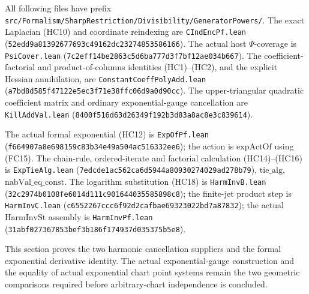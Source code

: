 All following files have prefix
\texttt{src/Formalism/SharpRestriction/Divisibility/GeneratorPowers/}.
The exact Laplacian (HC10) and coordinate reindexing are
\texttt{CIndEncPf.lean}
(\texttt{52edd9a81392677693c49162dc23274853586166}).
The actual host \(\Psi\)-coverage is
\texttt{PsiCover.lean}
(\texttt{7c2eff14be2863c5d6ba777d3f7bf12ae034b667}).
The coefficient-factorial and product-of-columns
identities (HC1)--(HC2), and the explicit Hessian
annihilation, are \texttt{ConstantCoeffPolyAdd.lean}
(\texttt{a7bd8d585f47122e5ec3f71e38ffc06d9a0d90cc}).
The upper-triangular quadratic coefficient matrix and
ordinary exponential-gauge cancellation are
\texttt{KillAddVal.lean}
(\texttt{8400f516d63d26349f192b3d83a8ac8e3c839614}).

The actual formal exponential (HC12) is
\texttt{ExpOfPf.lean}
(\texttt{f664907a8e698159c83b34e49a504ac516332ee6});
the action is \(\mathrm{expActOf}\) using (FC15).
The chain-rule, ordered-iterate and factorial calculation
(HC14)--(HC16) is \texttt{ExpTieAlg.lean}
(\texttt{7edcde1ac562ca6d5944a80930274029ad278b79}),
\(\mathrm{tie\_alg}\), \(\mathrm{nabVal\_eq\_const}\).
The logarithm substitution (HC18) is
\texttt{HarmInvB.lean}
(\texttt{32c2974b0108fe6014d111c901644035585898c8});
the finite-jet product step is \texttt{HarmInvC.lean}
(\texttt{c6552267ccc6f92d2cafbae69323022bd7a87832});
the actual \(\mathrm{HarmInvSt}\) assembly is
\texttt{HarmInvPf.lean}
(\texttt{31abf027367853bef3b186f174937d035375b5e8}).

This section proves the two harmonic cancellation
suppliers and the formal exponential derivative
identity.  The actual exponential-gauge construction
and the equality of actual exponential chart point
systems remain the two geometric comparisons required
before arbitrary-chart independence is concluded.
